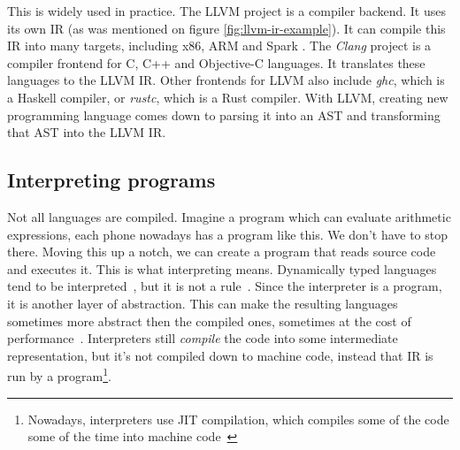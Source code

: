This is widely used in practice. The LLVM \cite{llvm} project is a compiler
backend. It uses its own IR (as was mentioned on figure
\ref{fig:llvm-ir-example}). It can compile this IR into many targets, including
x86, ARM and Spark . The \textit{Clang} project is a compiler
frontend for C, C++ and Objective-C languages. It translates these languages to
the LLVM IR. Other frontends for LLVM also include \textit{ghc}, which is a
Haskell compiler, or \textit{rustc}, which is a Rust compiler. With LLVM,
creating new programming language comes down to parsing it into an AST and
transforming that AST into the LLVM IR.

\subsection{Interpreting programs}
Not all languages are compiled. Imagine a program which can evaluate arithmetic
expressions, each phone nowadays has a program like this. We don't have to stop
there. Moving this up a notch, we can create a program that reads source code
and executes it. This is what interpreting means. Dynamically typed languages
tend to be interpreted~\cite{python, lua, javascript}, but it is not a rule~\cite{scala}. Since
the interpreter is a program, it is another layer of abstraction. This can make
the resulting languages sometimes more abstract then the compiled ones,
sometimes at the cost of performance~\cite{jit}. Interpreters still
\textit{compile} the code into some intermediate representation, but it's not
compiled down to machine code, instead that IR is run by a
program\footnote{Nowadays, interpreters use JIT compilation, which compiles
some of the code some of the time into machine code~\cite{jit}}.
